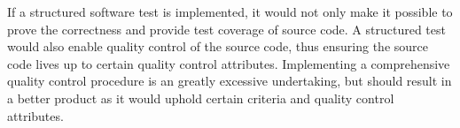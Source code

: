 If a structured software test is implemented, it would not only make it possible to prove the correctness and provide test coverage of source code. A structured test would also enable quality control of the source code, thus ensuring the source code lives up to certain quality control attributes. Implementing a comprehensive quality control procedure is an greatly excessive undertaking, but should result in a better product as it would uphold certain criteria and quality control attributes.